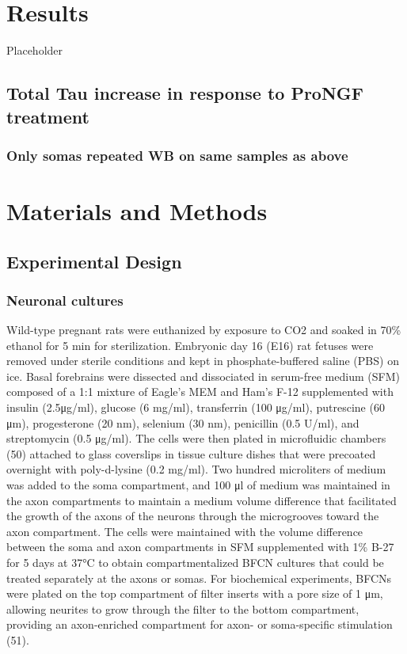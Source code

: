 \documentclass[
]{article}
\begin{document}
\section{Results}\label{results}

Placeholder

\subsection{Total Tau increase in response to ProNGF treatment}\label{total-tau-increase-in-response-to-prongf-treatment}

\subsubsection{Only somas repeated WB on same samples as above}\label{only-somas-repeated-wb-on-same-samples-as-above}

\section{Materials and Methods}\label{materials-and-methods}

\subsection{Experimental Design}\label{experimental-design}

\subsubsection{Neuronal cultures}\label{neuronal-cultures}

Wild-type pregnant rats were euthanized by exposure to CO2 and soaked in 70\% ethanol for 5 min for sterilization.
Embryonic day 16 (E16) rat fetuses were removed under sterile conditions and kept in phosphate-buffered saline (PBS) on ice. Basal forebrains were dissected and dissociated in serum-free medium (SFM) composed of a 1:1 mixture of Eagle's MEM and Ham's F-12 supplemented with insulin (2.5μg/ml), glucose (6 mg/ml), transferrin (100 μg/ml), putrescine (60 μm), progesterone (20 nm), selenium (30 nm), penicillin (0.5 U/ml), and streptomycin (0.5 μg/ml). The cells were then plated in microfluidic chambers (50) attached to glass coverslips in tissue culture dishes that were precoated overnight with poly-d-lysine (0.2 mg/ml). Two hundred microliters of medium was added to the soma compartment, and 100 μl of medium was maintained in the axon compartments to maintain a
medium volume difference that facilitated the growth of the axons
of the neurons through the microgrooves toward the axon compartment. The cells were maintained with the volume difference
between the soma and axon compartments in SFM supplemented
with 1\% B-27 for 5 days at 37°C to obtain compartmentalized
BFCN cultures that could be treated separately at the axons or
somas. For biochemical experiments, BFCNs were plated on the
top compartment of filter inserts with a pore size of 1 μm, allowing neurites to grow through the filter to the bottom compartment,
providing an axon-enriched compartment for axon- or soma-specific
stimulation (51).
\end{document}
